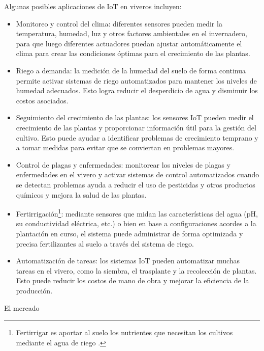 Algunas posibles aplicaciones de IoT en viveros incluyen:
\begin{itemize}
	\item Monitoreo y control del clima: diferentes sensores pueden medir la temperatura, humedad, luz y otros factores ambientales en el invernadero, para que luego diferentes actuadores puedan ajustar automáticamente el clima para crear las condiciones óptimas para el crecimiento de las plantas.

    \item Riego a demanda: la medición de la humedad del suelo de forma continua permite activar sistemas de riego automatizados para mantener los niveles de humedad adecuados. Esto logra reducir el desperdicio de agua y disminuir los costos asociados.

    \item Seguimiento del crecimiento de las plantas: los sensores IoT pueden medir el crecimiento de las plantas y proporcionar información útil para la gestión del cultivo. Esto puede ayudar a identificar problemas de crecimiento temprano y a tomar medidas para evitar que se conviertan en problemas mayores.

    \item Control de plagas y enfermedades: monitorear los niveles de plagas y enfermedades en el vivero y activar sistemas de control automatizados cuando se detectan problemas ayuda a reducir el uso de pesticidas y otros productos químicos y mejora la salud de las plantas.
    
   \item  Fertirrigación\footnote{Fertirrigar es aportar al suelo los nutrientes que necesitan los cultivos mediante el agua de riego \citep{mapa:1}.}: mediante sensores que midan las características del agua (pH, su conductividad eléctrica, etc.) o bien en base a configuraciones acordes a la plantación en curso, el sistema puede administrar de forma optimizada y precisa fertilizantes al suelo a través del sistema de riego.

    \item Automatización de tareas: los sistemas IoT pueden automatizar muchas tareas en el vivero, como la siembra, el trasplante y la recolección de plantas. Esto puede reducir los costos de mano de obra y mejorar la eficiencia de la producción.
\end{itemize}    
    
El mercado 




